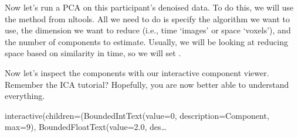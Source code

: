 \documentclass[letterpaper,10pt,english]{sphinxmanual}
\begin{document}
\begin{sphinxVerbatim}[commandchars=\\\{\}]
  
  

\PYG{p}{[}\PYG{p}{]}
\end{sphinxVerbatim}

Now let’s run a PCA on this participant’s denoised data. To do this, we will use the  method from nltools. All we need to do is specify the algorithm we want to use, the dimension we want to reduce (i.e., time \sphinxhyphen{} ‘images’ or space ‘voxels’), and the number of components to estimate. Usually, we will be looking at reducing space based on similarity in time, so we will set .

\begin{sphinxVerbatim}[commandchars=\\\{\}]
  

    
\end{sphinxVerbatim}

Now let’s inspect the components with our interactive component viewer. Remember the ICA tutorial? Hopefully, you are now better able to understand everything.

\begin{sphinxVerbatim}[commandchars=\\\{\}]
 
\end{sphinxVerbatim}

\begin{sphinxVerbatim}[commandchars=\\\{\}]
interactive(children=(BoundedIntText(value=0, description=\PYGZsq{}Component\PYGZsq{}, max=9), BoundedFloatText(value=2.0, des…
\end{sphinxVerbatim}
\end{document}
